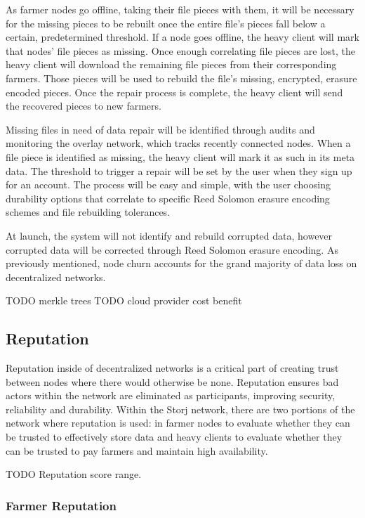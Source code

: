 \documentclass[a4paper,10pt]{article} \usepackage[utf8]{inputenc}
\newcommand{\todo}[1]{{\color{red} TODO #1}}
\begin{document}
As farmer nodes go offline, taking their file pieces with them, it will be 
necessary for the missing pieces to be rebuilt once the entire file’s pieces 
fall below a certain, predetermined threshold. If a node goes offline, the 
heavy client will mark that nodes’ file pieces as missing. Once enough 
correlating file pieces are lost, the heavy client will download the 
remaining file pieces from their corresponding farmers. Those pieces will 
be used to rebuild the file’s missing, encrypted, erasure encoded pieces. 
Once the repair process is complete, the heavy client will send the 
recovered pieces to new farmers. 

Missing files in need of data repair will be identified through audits 
and monitoring the overlay network, which tracks recently connected nodes. 
When a file piece is identified as missing, the heavy client will mark it 
as such in its meta data. The threshold to trigger a repair will be set by 
the user when they sign up for an account. The process will be easy and 
simple, with the user choosing durability options that correlate to specific
Reed Solomon erasure encoding schemes and file rebuilding tolerances. 

At launch, the system will not identify and rebuild corrupted data, however 
corrupted data will be corrected through Reed Solomon erasure encoding. As 
previously mentioned, node churn accounts for the grand majority of data 
loss on decentralized networks. 





\todo{merkle trees}
\todo{cloud provider cost benefit}

\subsection{Reputation}
Reputation inside of decentralized networks is a critical part of creating trust between nodes where there would otherwise be none. Reputation ensures bad actors within the network are eliminated as participants, improving security, reliability and durability. Within the Storj network, there are two portions of the network where reputation is used: in farmer nodes to evaluate whether they can be trusted to effectively store data and heavy clients to evaluate whether they can be trusted to pay farmers and maintain high availability. 

\todo{Reputation score range. }


\subsubsection{Farmer Reputation}
\end{document}
